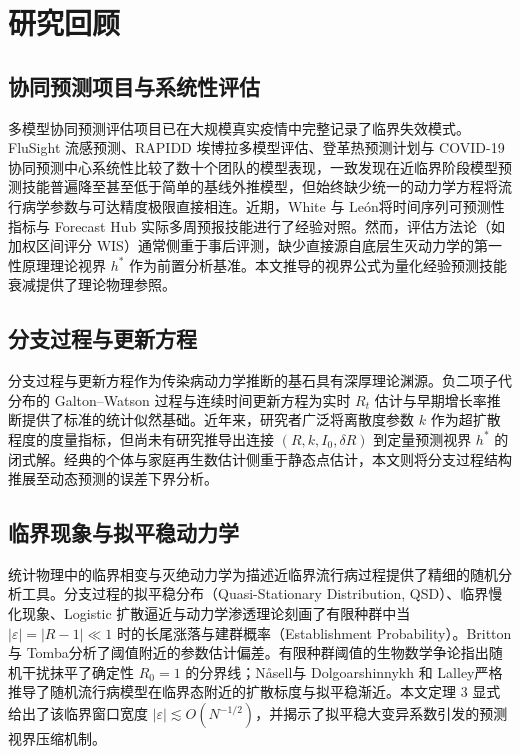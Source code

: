 \documentclass[11pt,a4paper]{article}
\theoremstyle{plain}
\theoremstyle{definition}
\begin{document}
\section{研究回顾}

\subsection{协同预测项目与系统性评估}
多模型协同预测评估项目已在大规模真实疫情中完整记录了临界失效模式。FluSight 流感预测\citep{mcgowan2019collaborative}、RAPIDD 埃博拉多模型评估\citep{viboud2018rapidd}、登革热预测计划\citep{johansson2019open}与 COVID-19 协同预测中心\citep{cramer2022evaluation}系统性比较了数十个团队的模型表现，一致发现在近临界阶段模型预测技能普遍降至甚至低于简单的基线外推模型，但始终缺少统一的动力学方程将流行病学参数与可达精度极限直接相连。近期，White 与 Le{\'o}n\citep{white2026forecastability}将时间序列可预测性指标与 Forecast Hub 实际多周预报技能进行了经验对照。然而，评估方法论（如加权区间评分 WIS\citep{bracher2021evaluating}）通常侧重于事后评测，缺少直接源自底层生灭动力学的第一性原理理论视界 $h^*$ 作为前置分析基准。本文推导的视界公式为量化经验预测技能衰减提供了理论物理参照。

\subsection{分支过程与更新方程}
分支过程与更新方程作为传染病动力学推断的基石具有深厚理论渊源。负二项子代分布的 Galton--Watson 过程\citep{harris1963branching, athreya1972branching, jagers1975branching}与连续时间更新方程\citep{wallinga2004different, wallinga2007generation, cori2013framework}为实时 $R_t$ 估计\citep{abbott2020epinow2, gostic2020practical}与早期增长率推断\citep{bettencourt2008real}提供了标准的统计似然基础。近年来，研究者广泛将离散度参数 $k$ 作为超扩散程度的度量指标\citep{lloyd-smith2005superspreading, endo2020overdispersion}，但尚未有研究推导出连接 $(R, k, I_0, \delta R)$ 到定量预测视界 $h^*$ 的闭式解。经典的个体与家庭再生数估计\citep{fraser2007estimating}侧重于静态点估计，本文则将分支过程结构推展至动态预测的误差下界分析。

\subsection{临界现象与拟平稳动力学}
统计物理中的临界相变与灭绝动力学为描述近临界流行病过程提供了精细的随机分析工具。分支过程的拟平稳分布（Quasi-Stationary Distribution, QSD）\citep{darroch1965quasi}、临界慢化现象\citep{kessler2007extinction}、Logistic 扩散逼近\citep{ethier1986markov}与动力学渗透理论\citep{grassberger1983critical}刻画了有限种群中当 $|\varepsilon|=|R-1| \ll 1$ 时的长尾涨落与建群概率（Establishment Probability）。Britton 与 Tomba\citep{britton2019estimation}分析了阈值附近的参数估计偏差。有限种群阈值的生物数学争论\citep{lloydsmith2005should}指出随机干扰抹平了确定性 $R_0 = 1$ 的分界线；N{\aa}sell\citep{nasell1999quasi}与 Dolgoarshinnykh 和 Lalley\citep{dolgoarshinnykh2006critical}严格推导了随机流行病模型在临界态附近的扩散标度与拟平稳渐近。本文定理 3 显式给出了该临界窗口宽度 $|\varepsilon| \lesssim O(N^{-1/2})$，并揭示了拟平稳大变异系数引发的预测视界压缩机制。
\end{document}
